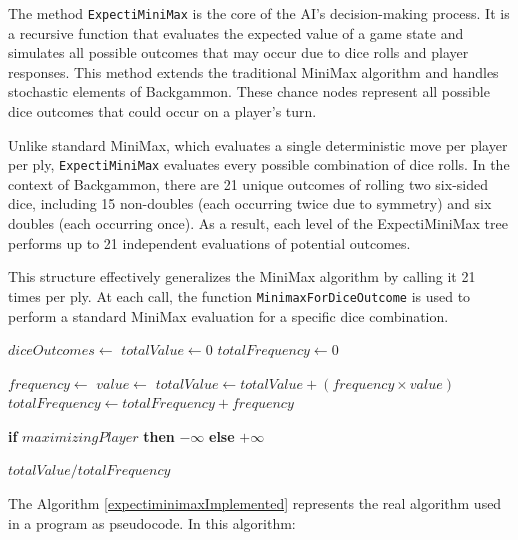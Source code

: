 The method \texttt{ExpectiMiniMax} is the core of the AI's decision-making process. It is a recursive function that evaluates the expected value of a game state and simulates all possible outcomes that may occur due to dice rolls and player responses. This method extends the traditional MiniMax algorithm and handles stochastic elements of Backgammon. These chance nodes represent all possible dice outcomes that could occur on a player's turn.

Unlike standard MiniMax, which evaluates a single deterministic move per player per ply, \texttt{ExpectiMiniMax} evaluates every possible combination of dice rolls. In the context of Backgammon, there are 21 unique outcomes of rolling two six-sided dice, including 15 non-doubles (each occurring twice due to symmetry) and six doubles (each occurring once). As a result, each level of the ExpectiMiniMax tree performs up to 21 independent evaluations of potential outcomes.

This structure effectively generalizes the MiniMax algorithm by calling it 21 times per ply. At each call, the function \texttt{MinimaxForDiceOutcome} is used to perform a standard MiniMax evaluation for a specific dice combination.


\begin{algorithm}[H]
\caption{ExpectiMiniMax Algorithm}
\label{expectiminimaxImplemented}
\begin{algorithmic}[1]
    \State $diceOutcomes \gets$ 
    \State $totalValue \gets 0$
    \State $totalFrequency \gets 0$

        \State $frequency \gets$ 
        \State $value \gets$ 
        \State $totalValue \gets totalValue + (frequency \times value)$
        \State $totalFrequency \gets totalFrequency + frequency$
    \EndFor

        \State \Return \textbf{if} $maximizingPlayer$ \textbf{then} $-\infty$ \textbf{else} $+\infty$
    \EndIf

    \State \Return $totalValue / totalFrequency$
\EndFunction
\end{algorithmic}
\end{algorithm}

The Algorithm \ref{expectiminimaxImplemented} represents the real algorithm used in a program as pseudocode. In this algorithm:

